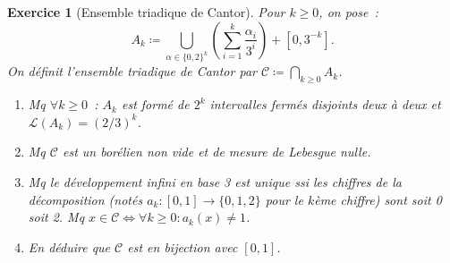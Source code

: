 \documentclass{article}
\newtheorem{ex}{Exercice}[section]
\theoremstyle{definition}
\begin{document}
\begin{ex}[Ensemble triadique de Cantor] Pour $k \geq 0$, on pose~:
\[A_k \coloneqq \bigcup_{\alpha \in \{0, 2\}^k}\left(\sum_{i=1}^k\frac {\alpha_i}{3^i}\right) + [0, 3^{-k}].\]
On définit l'\textit{ensemble triadique de Cantor} par $\mathscr C \coloneqq \bigcap_{k \geq 0}A_k$.
\begin{enumerate}
	\item Mq $\forall k \geq 0$~: $A_k$ est formé de $2^k$ intervalles fermés disjoints deux à deux et $\mathcal L(A_k) = (2/3)^k$.
	\item Mq $\mathscr C$ est un borélien non vide et de mesure de Lebesgue nulle.
	\item Mq le développement infini en base 3 est unique ssi les chiffres de la décomposition (notés $a_k : [0, 1] \to \{0, 1, 2\}$ pour le $k$ème chiffre)
	sont soit 0 soit 2. Mq $x \in \mathscr C \iff \forall k \geq 0 : a_k(x) \neq 1$.
	\item En déduire que $\mathscr C$ est en bijection avec $[0, 1]$.
\end{enumerate}
\end{ex}
\end{document}
